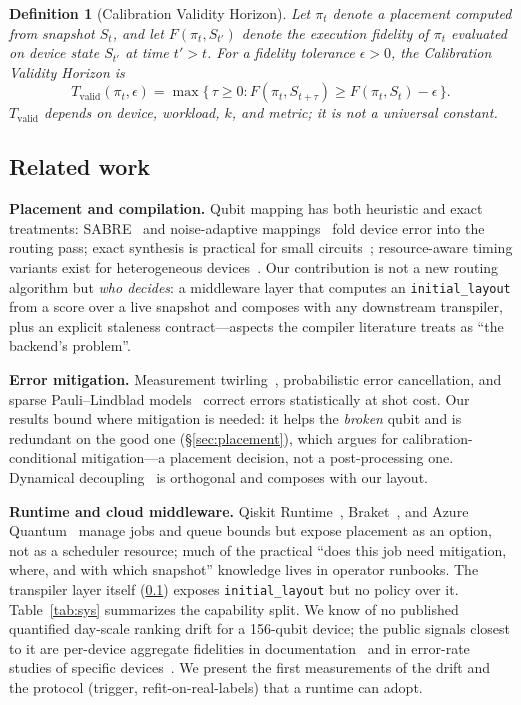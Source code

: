 \documentclass[journal,10pt,twocolumn]{IEEEtran}
\newtheorem{definition}{Definition}
\begin{document}
\begin{definition}[Calibration Validity Horizon]
\label{def:tvalid}
Let $\pi_t$ denote a placement computed from snapshot $S_t$, and let $F(\pi_t, S_{t'})$ denote the execution
fidelity of $\pi_t$ evaluated on device state $S_{t'}$ at time $t' > t$. For a fidelity tolerance
$\epsilon > 0$, the \emph{Calibration Validity Horizon} is
\begin{equation}
T_{\mathrm{valid}}(\pi_t, \epsilon) = \max\{\,\tau \ge 0 : F(\pi_t, S_{t+\tau}) \ge F(\pi_t, S_t) - \epsilon\,\}.
\label{eq:tvalid}
\end{equation}
$T_{\mathrm{valid}}$ depends on device, workload, $k$, and metric; it is not a universal constant.
\end{definition}

\subsection{Related work}
\label{sec:related2}
\textbf{Placement and compilation.} Qubit mapping has both heuristic and exact treatments: SABRE~\cite{li2019sabre}
and noise-adaptive mappings~\cite{murali2019noise} fold device error into the routing pass; exact synthesis is
practical for small circuits~\cite{tan2020iccado}; resource-aware timing variants exist for heterogeneous
devices~\cite{lao2022timing}. Our contribution is not a new routing algorithm but \emph{who decides}: a middleware
layer that computes an \texttt{initial\_layout} from a score over a live snapshot and composes with any downstream
transpiler, plus an explicit staleness contract---aspects the compiler literature treats as ``the backend's
problem''.

\textbf{Error mitigation.} Measurement twirling~\cite{nation2023,bravyi2021meas}, probabilistic error cancellation,
and sparse Pauli--Lindblad models~\cite{vanberg2023,temme2017} correct errors statistically at shot cost. Our results
bound where mitigation is needed: it helps the \emph{broken} qubit and is redundant on the good one
(\S\ref{sec:placement}), which argues for calibration-conditional mitigation---a placement decision, not a
post-processing one. Dynamical decoupling~\cite{viola1999dd} is orthogonal and composes with our layout.

\textbf{Runtime and cloud middleware.} Qiskit Runtime~\cite{ibmrtime}, Braket~\cite{braket}, and Azure
Quantum~\cite{azureq} manage jobs and queue bounds but expose placement as an option, not as a scheduler resource;
much of the practical ``does this job need mitigation, where, and with which snapshot'' knowledge lives in operator
runbooks. The transpiler layer itself (\ref{sec:related2}) exposes \texttt{initial\_layout} but no policy over it.
Table~\ref{tab:sys} summarizes the capability split. We know of no published quantified day-scale ranking drift for a
156-qubit device; the public signals closest to it are per-device aggregate fidelities in
documentation~\cite{ibmcalib} and in error-rate studies of specific devices~\cite{kim2023utility}. We present the
first measurements of the drift and the protocol (trigger, refit-on-real-labels) that a runtime can adopt.
\end{document}

